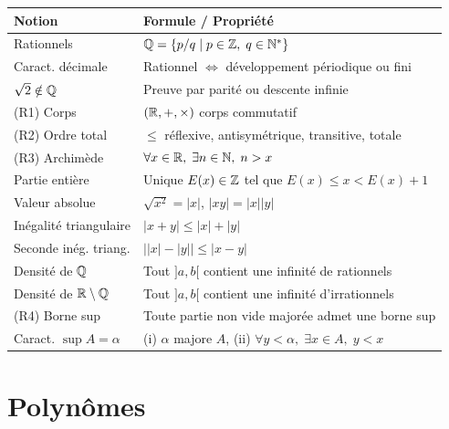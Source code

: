 \begin{center}
\renewcommand{\arraystretch}{1.4}
\begin{tabular}{|l|l|}
\hline
\textbf{Notion} & \textbf{Formule / Propriété} \\
\hline
Rationnels & $\mathbb{Q} = \{p/q \mid p \in \mathbb{Z},\; q \in \mathbb{N}^*\}$ \\
Caract. décimale & Rationnel $\iff$ développement périodique ou fini \\
$\sqrt{2} \notin \mathbb{Q}$ & Preuve par parité ou descente infinie \\
(R1) Corps & $(\mathbb{R}, +, \times)$ corps commutatif \\
(R2) Ordre total & $\leqslant$ réflexive, antisymétrique, transitive, totale \\
(R3) Archimède & $\forall x \in \mathbb{R},\; \exists n \in \mathbb{N},\; n > x$ \\
Partie entière & Unique $E(x) \in \mathbb{Z}$ tel que $E(x) \leqslant x < E(x) + 1$ \\
Valeur absolue & $\sqrt{x^2} = |x|$, $|xy| = |x||y|$ \\
Inégalité triangulaire & $|x + y| \leqslant |x| + |y|$ \\
Seconde inég. triang. & $\bigl||x| - |y|\bigr| \leqslant |x - y|$ \\
Densité de $\mathbb{Q}$ & Tout $]a, b[$ contient une infinité de rationnels \\
Densité de $\mathbb{R} \setminus \mathbb{Q}$ & Tout $]a, b[$ contient une infinité d'irrationnels \\
(R4) Borne sup & Toute partie non vide majorée admet une borne sup \\
Caract. $\sup A = \alpha$ & (i) $\alpha$ majore $A$, (ii) $\forall y < \alpha,\; \exists x \in A,\; y < x$ \\
\hline
\end{tabular}
\end{center}

\section{Polynômes}

